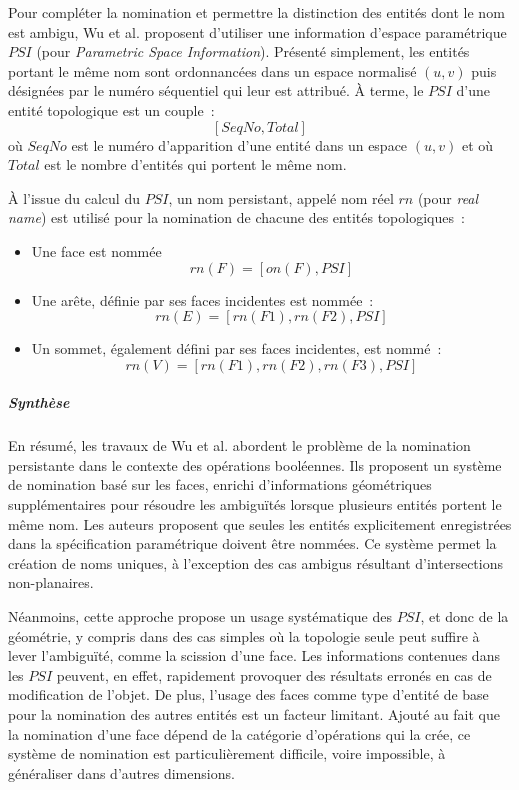 Pour compléter la nomination et permettre la distinction des entités dont le
nom est ambigu, Wu et al. proposent d'utiliser une information d'espace
paramétrique \(PSI\) (pour \emph{Parametric Space Information}). %
Présenté simplement, les entités portant le même nom sont ordonnancées dans un
espace normalisé \((u,v)\) puis désignées par le numéro séquentiel qui leur est
attribué. %
À terme, le \(PSI\) d'une entité topologique est un couple~:
\[[SeqNo, Total]\] %
où \(SeqNo\) est le numéro d'apparition d'une entité dans un espace \((u,v)\) et
où \(Total\) est le nombre d'entités qui portent le même nom. %

À l'issue du calcul du \(PSI\), un nom persistant, appelé nom réel \(rn\) (pour
\emph{real name}) est utilisé pour la nomination de chacune des entités
topologiques~:
\begin{itemize}
	\item Une face est nommée %
	      \[rn(F) = [on(F), PSI]\]
	\item Une arête, définie par ses faces incidentes est nommée~:
	      \[rn(E) = [rn(F1), rn(F2), PSI]\]
	\item Un sommet, également défini par ses faces incidentes, est nommé~:
	      \[rn(V) = [rn(F1), rn(F2),rn(F3), PSI]\]
\end{itemize}


\subparagraph{Synthèse}

En résumé, les travaux de Wu et al. abordent le problème de la nomination persistante dans le contexte des opérations booléennes. Ils proposent un système de nomination basé sur les faces, enrichi d'informations géométriques supplémentaires pour résoudre les ambiguïtés lorsque plusieurs entités portent le même nom. Les auteurs proposent que seules les entités explicitement enregistrées dans la spécification paramétrique doivent être nommées. Ce système permet la création de noms uniques, à l'exception des cas ambigus résultant d'intersections non-planaires.

Néanmoins, cette approche propose un usage systématique des \(PSI\), et donc de
la géométrie, y compris dans des cas simples où la topologie seule peut suffire
à lever l'ambiguïté, comme la scission d'une face. %
Les informations contenues dans les \(PSI\) peuvent, en effet, rapidement
provoquer des résultats erronés en cas de modification de l'objet. %
De plus, l'usage des faces comme type d'entité de base pour la nomination des
autres entités est un facteur limitant. %
Ajouté au fait que la nomination d'une face dépend de la catégorie d'opérations
qui la crée, ce système de nomination est particulièrement difficile, voire
impossible, à généraliser dans d'autres dimensions. %

